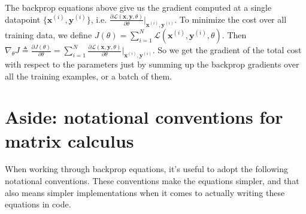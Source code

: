 
The backprop equations above give us the gradient computed at a single datapoint $\{\mathbf{x}^{(i)}, \mathbf{y}^{(i)}\}$, i.e. $\frac{\partial \mathcal{L}(\mathbf{x}, \mathbf{y}, \theta)}{\partial \theta}\bigg\rvert_{\mathbf{x}^{(i)}, \mathbf{y}^{(i)}}$. To minimize the cost over all training data, we define $J(\theta) = \sum_{i=1}^N \mathcal{L}(\mathbf{x}^{(i)}, \mathbf{y}^{(i)}, \theta)$. Then $\nabla_{\theta} J \triangleq \frac{\partial J(\theta)}{\partial \theta} = \sum_{i=1}^N \frac{\partial \mathcal{L}(\mathbf{x}, \mathbf{y}, \theta)}{\partial \theta}\bigg\rvert_{\mathbf{x}^{(i)}, \mathbf{y}^{(i)}}$. So we get the gradient of the total cost with respect to the parameters just by summing up the backprop gradients over all the training examples, or a batch of them.

\section{Aside: notational conventions for matrix calculus}\label{backprop:notational_conventions}
When working through backprop equations, it's useful to adopt the following notational conventions. These conventions make the equations simpler, and that also means simpler implementations when it comes to actually writing these equations in code.

